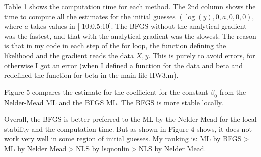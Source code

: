 \documentclass[11pt]{article}
\begin{document}
Table 1 shows the computation time for each method. The 2nd column shows the time to compute all the estimates for the initial guesses $(\log(\bar{y}), 0, a, 0, 0, 0)$, where $a$ takes values in [-10:0.5:10]. The BFGS without the analytical gradient was the fastest, and that with the analytical gradient was the slowest. The reason is that in my code in each step of the for loop, the function defining the likelihood and the gradient reads the data $X, y$. This is purely to avoid errors, for otherwise I got an error (when I defined a function for the data and beta and redefined the function for beta in the main file HW3.m).\par
Figure 5 compares the estimate for the coefficient for the constant $\beta_{0}$ from the Nelder-Mead ML and the BFGS ML. The BFGS is more stable locally.\par
Overall, the BFGS is better preferred to the ML by the Nelder-Mead for the local stability and the computation time. But as shown in Figure 4 shows, it does not work very well in some region of initial guesses. My ranking is: ML by BFGS$>$ML by Nelder Mead$>$NLS by lsqnonlin$>$NLS by Nelder Mead.
\end{document}
